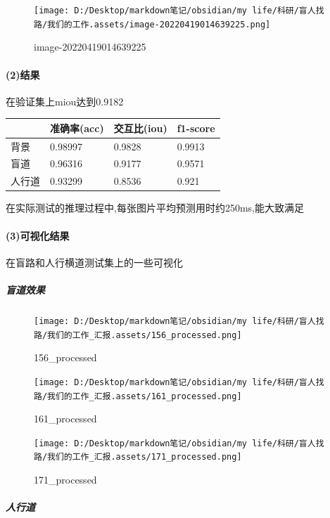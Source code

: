 \documentclass[]{article}
\let\oldparagraph\paragraph
\renewcommand{\paragraph}[1]{\oldparagraph{#1}\mbox{}}
\let\oldsubparagraph\subparagraph
\renewcommand{\subparagraph}[1]{\oldsubparagraph{#1}\mbox{}}
\begin{document}
\begin{figure}
\centering
\texttt{[image: D:/Desktop/markdown笔记/obsidian/my life/科研/盲人找路/我们的工作.assets/image-20220419014639225.png]}
\caption{image-20220419014639225}
\end{figure}

\hypertarget{2ux7ed3ux679c}{%
\paragraph{(2)结果}\label{2ux7ed3ux679c}}

在验证集上miou达到0.9182

\begin{longtable}[]{@{}llll@{}}
\toprule
& 准确率(acc) & 交互比(iou) & f1-score\tabularnewline
\midrule
\endhead
背景 & 0.98997 & 0.9828 & 0.9913\tabularnewline
盲道 & 0.96316 & 0.9177 & 0.9571\tabularnewline
人行道 & 0.93299 & 0.8536 & 0.921\tabularnewline
\bottomrule
\end{longtable}

在实际测试的推理过程中,每张图片平均预测用时约250ms,能大致满足

\hypertarget{3ux53efux89c6ux5316ux7ed3ux679c}{%
\paragraph{(3)可视化结果}\label{3ux53efux89c6ux5316ux7ed3ux679c}}

在盲路和人行横道测试集上的一些可视化

\hypertarget{ux76f2ux9053ux6548ux679c}{%
\subparagraph{盲道效果}\label{ux76f2ux9053ux6548ux679c}}

\begin{figure}
\centering
\texttt{[image: D:/Desktop/markdown笔记/obsidian/my life/科研/盲人找路/我们的工作\_汇报.assets/156\_processed.png]}
\caption{156\_processed}
\end{figure}

\begin{figure}
\centering
\texttt{[image: D:/Desktop/markdown笔记/obsidian/my life/科研/盲人找路/我们的工作\_汇报.assets/161\_processed.png]}
\caption{161\_processed}
\end{figure}

\begin{figure}
\centering
\texttt{[image: D:/Desktop/markdown笔记/obsidian/my life/科研/盲人找路/我们的工作\_汇报.assets/171\_processed.png]}
\caption{171\_processed}
\end{figure}

\hypertarget{ux4ebaux884cux9053}{%
\subparagraph{人行道}\label{ux4ebaux884cux9053}}
\end{document}

